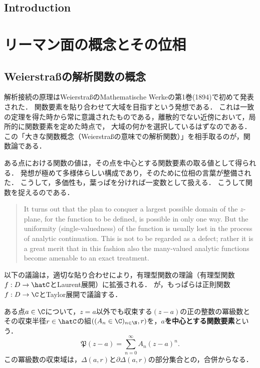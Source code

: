 \documentclass[uplatex, dvipdfmx]{jsreport}
\begin{document}
\section{Introduction}



\chapter{リーマン面の概念とその位相}

\section{Weierstraßの解析関数の概念}

\begin{screen}
    解析接続の原理はWeierstraßのMathematische Werkeの第1巻(1894)で初めて発表された．
    関数要素を貼り合わせて大域を目指すという発想である．
    これは一致の定理を得た時から常に意識されたものである，離散的でない近傍において，局所的に関数要素を定めた時点で，
    大域の何かを選択しているはずなのである．
    この「大きな関数概念（Weierstraßの意味での解析関数）」を相手取るのが，関数論である．

    ある点における関数の値は，その点を中心とする関数要素の取る値として得られる．
    発想が極めて多様体らしい構成であり，そのために位相の言葉が整備された．
    こうして，多価性も，葉っぱを分ければ一変数として扱える．
    こうして関数を捉えるのである．
    \begin{quotation}
        It turns out that the plan to conquer a largest possible domain of the $z$-plane, for the function to be defined, is possible in only one way. But the uniformity (single-valuedness) of the function is usually lost in the process of analytic continuation.
        This is not to be regarded as a defect; rather it is a great merit that in this fashion also the many-valued analytic functions become amenable to an exact treatment.\cite{Weyl}
    \end{quotation}
\end{screen}

\begin{remark}
    以下の議論は，適切な貼り合わせにより，有理型関数の理論（有理型関数$f:D\to\hatC$とLaurent展開）に拡張される．
    が，もっぱらは正則関数$f:D\to\C$とTaylor展開で議論する．
\end{remark}

\begin{definition}
    ある点$a\in\C$について，$z=a$以外でも収束する$(z-a)$の正の整数の冪級数とその収束半径$r\in\hatC$の組$((A_n\in\C)_{n\in\N},r)$を，\textbf{$a$を中心とする関数要素}という．
    \[\mathfrak{P}(z-a)=\sum^\infty_{n=0}A_n(z-a)^n.\]
    この冪級数の収束域は，$\Delta(a,r)$と$\partial\Delta(a,r)$の部分集合との，合併からなる．
\end{definition}
\end{document}
